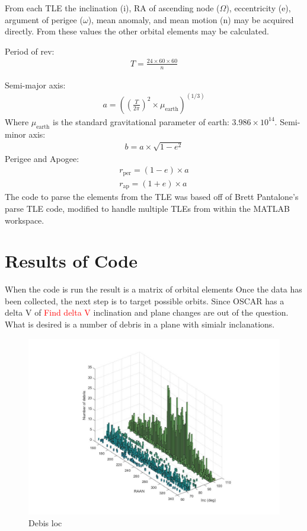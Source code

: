 \documentclass[12pt]{article}
\begin{document}
			
		
		From each TLE the inclination (i), RA of ascending node ($\Omega$), eccentricity (e), argument of perigee ($\omega$), mean anomaly, and mean motion (n) may be acquired directly. From these values the other orbital elements may be calculated. 
		
		Period of rev:
		\begin{align}
		T=\frac{24\times60\times60}{n}
		\end{align}
		
		Semi-major axis:
		\begin{align}
		a=\left(\left(\frac{T}{2\pi}\right)^2 \times \mu_\text{earth}\right)^{(1/3)}
		\end{align}
		Where $\mu_\text{earth}$ is the standard gravitational parameter of earth: $3.986\times10^{14}$. Semi-minor axis:
		\begin{align}
		b=a\times\sqrt{1-e^2}
		\end{align}
		Perigee and Apogee:
		\begin{align}
		r_\text{per}=\left(1-e\right)\times a\\
		r_\text{ap}=\left(1+e\right)\times a
		\end{align}
		The code to parse the elements from the TLE was based off of Brett Pantalone's parse TLE code\cite{codeParseTLE}, modified to handle multiple TLEs from within the MATLAB workspace. 
		
		\section{Results of Code}
		When the code is run the result is a matrix of orbital elements 
		Once the data has been collected, the next step is to target possible orbits. Since OSCAR has a delta V of \textcolor{red}{Find delta V} inclination and plane changes are out of the question. What is desired is a number of debris in a plane with simialr inclanations.
		
		\begin{figure}[!]
			\centering
			\includegraphics[width=0.7\linewidth]{rann_inc}
			\caption{Debis loc}
			\label{fig:ranninc}
		\end{figure}
		
\end{document}
